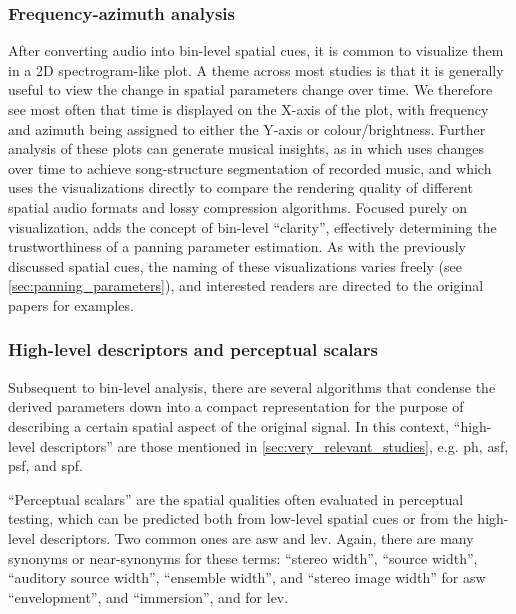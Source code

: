 \documentclass[referee,pdflatex,sn-mathphys-num]{sn-jnl}%
\newcommand{\q}[1]{\enquote{#1}}
\begin{document}
\subsubsection{Frequency-azimuth analysis}
\label{sec:faa}
After converting audio into bin-level spatial cues, it is common to visualize them in a 2D spectrogram-like plot. A theme across most studies is that it is generally useful to view the change in spatial parameters change over time. We therefore see most often that time is displayed on the X-axis of the plot, with frequency and azimuth being assigned to either the Y-axis or colour/brightness. Further analysis of these plots can generate musical insights, as in \cite{barryMusicStructureSegmentation2007} which uses changes over time to achieve song-structure segmentation of recorded music, and \cite{barryBinaspectPythonLibrary2025} which uses the visualizations directly to compare the rendering quality of different spatial audio formats and lossy compression algorithms. Focused purely on visualization, \cite{prestiVisualizationManipulationStereophonic2014} adds the concept of bin-level \q{clarity}, effectively determining the trustworthiness of a panning parameter estimation. As with the previously discussed spatial cues, the naming of these visualizations varies freely (see \cref{sec:panning_parameters}), and interested readers are directed to the original papers for examples.

\subsubsection{High-level descriptors and perceptual scalars}
\label{sec:high_level_descriptors}

Subsequent to bin-level analysis, there are several algorithms that condense the derived parameters down into a compact representation for the purpose of describing a certain spatial aspect of the original signal. In this context, \q{high-level descriptors} are those mentioned in \cref{sec:very_relevant_studies}, e.g. \gls{ph}, \gls{asf}, \gls{psf}, and \gls{spf}.

\q{Perceptual scalars} are the spatial qualities often evaluated in perceptual testing, which can be predicted both from low-level spatial cues or from the high-level descriptors. Two common ones are \gls{asw} and \gls{lev}. Again, there are many synonyms or near-synonyms for these terms: \q{stereo width}, \q{source width}, \q{auditory source width}, \q{ensemble width}, and \q{stereo image width} for \gls{asw}\; \q{envelopment}, and \q{immersion}, and for \gls{lev}.
\end{document}
